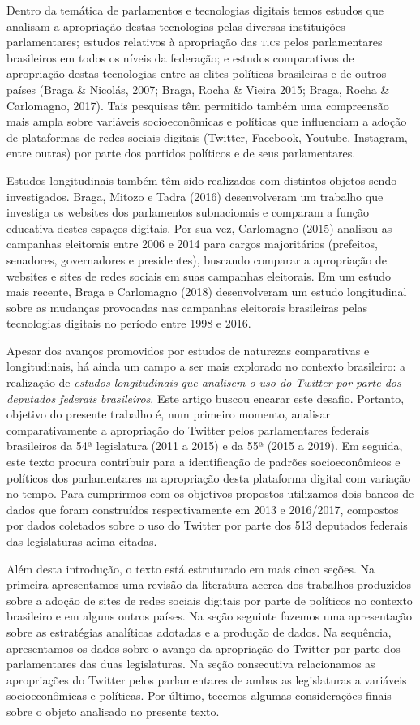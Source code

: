 Dentro da temática de parlamentos e tecnologias digitais temos estudos
que analisam a apropriação destas tecnologias pelas diversas
instituições parlamentares; estudos relativos à apropriação das \textsc{tic}s
pelos parlamentares brasileiros em todos os níveis da federação; e
estudos comparativos de apropriação destas tecnologias entre as elites
políticas brasileiras e de outros países (Braga \& Nicolás, 2007; Braga,
Rocha \& Vieira 2015; Braga, Rocha \& Carlomagno, 2017). Tais pesquisas
têm permitido também uma compreensão mais ampla sobre variáveis
socioeconômicas e políticas que influenciam a adoção de plataformas de
redes sociais digitais (Twitter, Facebook, Youtube, Instagram, entre
outras) por parte dos partidos políticos e de seus parlamentares.

Estudos longitudinais também têm sido realizados com distintos objetos
sendo investigados. Braga, Mitozo e Tadra (2016) desenvolveram um
trabalho que investiga os websites dos parlamentos subnacionais e
comparam a função educativa destes espaços digitais. Por sua vez,
Carlomagno (2015) analisou as campanhas eleitorais entre 2006 e 2014
para cargos majoritários (prefeitos, senadores, governadores e
presidentes), buscando comparar a apropriação de websites e sites de
redes sociais em suas campanhas eleitorais. Em um estudo mais recente,
Braga e Carlomagno (2018) desenvolveram um estudo longitudinal sobre as
mudanças provocadas nas campanhas eleitorais brasileiras pelas
tecnologias digitais no período entre 1998 e 2016.

Apesar dos avanços promovidos por estudos de naturezas comparativas e
longitudinais, há ainda um campo a ser mais explorado no contexto
brasileiro: a realização de \emph{estudos longitudinais} \emph{que
analisem o uso do Twitter por parte dos deputados federais brasileiros}.
Este artigo buscou encarar este desafio. Portanto, objetivo do presente
trabalho é, num primeiro momento, analisar comparativamente a
apropriação do Twitter pelos parlamentares federais brasileiros da 54ª
legislatura (2011 a 2015) e da 55ª (2015 a 2019). Em seguida, este texto
procura contribuir para a identificação de padrões socioeconômicos e
políticos dos parlamentares na apropriação desta plataforma digital com
variação no tempo. Para cumprirmos com os objetivos propostos utilizamos
dois bancos de dados que foram construídos respectivamente em 2013 e
2016/2017, compostos por dados coletados sobre o uso do Twitter por
parte dos 513 deputados federais das legislaturas acima citadas.

Além desta introdução, o texto está estruturado em mais cinco seções. Na
primeira apresentamos uma revisão da literatura acerca dos trabalhos
produzidos sobre a adoção de sites de redes sociais digitais por parte
de políticos no contexto brasileiro e em alguns outros países. Na seção
seguinte fazemos uma apresentação sobre as estratégias analíticas
adotadas e a produção de dados. Na sequência, apresentamos os dados
sobre o avanço da apropriação do Twitter por parte dos parlamentares das
duas legislaturas. Na seção consecutiva relacionamos as apropriações do
Twitter pelos parlamentares de ambas as legislaturas a variáveis
socioeconômicas e políticas. Por último, tecemos algumas considerações
finais sobre o objeto analisado no presente texto.

